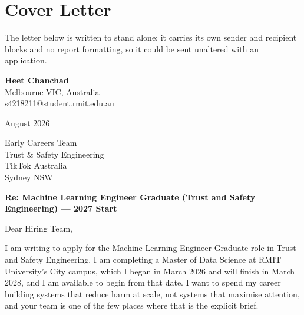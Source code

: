 \clearpage

\section{Cover Letter}
\label{sec:Cover Letter}

The letter below is written to stand alone: it carries its own sender and recipient
blocks and no report formatting, so it could be sent unaltered with an application.

\newpage

\thispagestyle{empty}
\begingroup
\singlespacing %

\noindent
{\large\textbf{Heet Chanchad}}\\[2pt]
Melbourne VIC, Australia\\
s4218211@student.rmit.edu.au

\vspace{14pt}

 August 2026

\vspace{12pt}

\noindent
Early Careers Team\\
Trust \& Safety Engineering\\
TikTok Australia\\
Sydney NSW

\vspace{12pt}

\noindent\textbf{Re: Machine Learning Engineer Graduate (Trust and Safety Engineering) ---
2027 Start}

\vspace{10pt}

\noindent Dear Hiring Team,

\vspace{8pt}

\noindent I am writing to apply for the Machine Learning Engineer Graduate role in Trust
and Safety Engineering. I am completing a Master of Data Science at RMIT University's City
campus, which I began in March 2026 and will finish in March 2028, and I am available to
begin from that date. I want to spend my career building systems that reduce harm at
scale, not systems that maximise attention, and your team is one of the few places where
that is the explicit brief.

\vspace{8pt}

